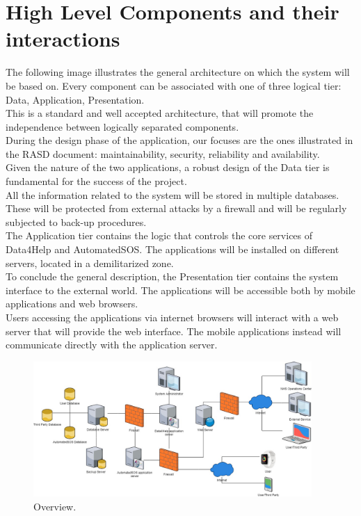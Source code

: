 \section{High Level Components and their interactions}
The following image illustrates the general architecture on which the system will be based on. Every component can be associated with one of three logical tier: Data, Application, Presentation. \\
This is a standard and well accepted architecture, that will promote the independence between logically separated components. \\
During the design phase of the application, our focuses are the ones illustrated in the RASD document: maintainability, security, reliability and availability. \\
Given the nature of the two applications, a robust design of the Data tier is fundamental for the success of the project. \\
All the information related to the system will be stored in multiple databases. These will be protected from external attacks by a firewall and will be regularly subjected to back-up procedures. \\
The Application tier contains the logic that controls the core services of Data4Help and AutomatedSOS. The applications will be installed on different servers, located in a demilitarized zone. \\
To conclude the general description, the Presentation tier contains the system interface to the external world. The applications will be accessible both by mobile applications and web browsers. \\
Users accessing the applications via internet browsers will interact with a web server that will provide the web interface. The mobile applications instead will communicate directly with the application server. \\

\begin{figure}[ht]
    \centering
    \includegraphics[width=300pt]{images/Overview.jpg}
    \caption{Overview.}
\end{figure}

